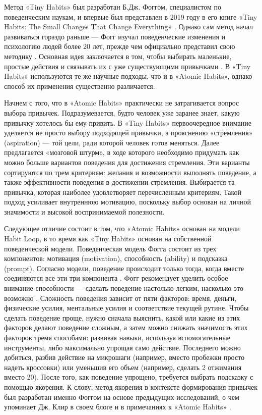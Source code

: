 \documentclass[pdflatex,sn-mathphys-num]{sn-jnl}%
\theoremstyle{thmstyleone}%
\theoremstyle{thmstyletwo}%
\theoremstyle{thmstylethree}%
\begin{document}
Метод «Tiny Habits» был разработан Б.Дж. Фоггом, специалистом по поведенческим наукам, и впервые был представлен в 2019 году в его книге «Tiny Habits: The Small Changes That Change Everything» \cite{phd_tiny_2020}. Однако сам метод начал развиваться гораздо раньше — Фогг изучал поведенческие изменения и психологию людей более 20 лет, прежде чем официально представил свою методику \cite{noauthor_tiny_nodate}. Основная идея заключается в том, чтобы выбирать маленькие, простые действия и связывать их с уже существующими привычками \cite{noauthor_bj_nodate}. В «Tiny Habits» используются те же научные подходы, что и в «Atomic Habits», однако способ их применения существенно различается.

Начнем с того, что в «Atomic Habits» практически не затрагивается вопрос выбора привычек. Подразумевается, будто человек уже заранее знает, какую привычку хотелось бы ему привить. В «Tiny Habits» первоочередное внимание уделяется не просто выбору подходящей привычки, а прояснению «стремления» (aspiration) — той цели, ради которой человек готов меняться. Далее предлагается «мозговой штурм», в ходе которого необходимо придумать как можно больше вариантов поведения для достижения стремления. Эти варианты сортируются по трем критериям: желания и возможности выполнять поведение, а также эффективности поведения в достижении стремления. Выбирается та привычка, которая наиболее удовлетворяет перечисленным критериям. Такой подход усиливает внутреннюю мотивацию, поскольку выбор основан на личной значимости и высокой воспринимаемой полезности.

Следующее отличие состоит в том, что «Atomic Habits» основан на модели Habit Loop, в то время как «Tiny Habits» основан на собственной поведенческой модели. Поведенческая модель Фогга состоит из трех компонентов: мотивация (motivation), способность (ability) и подсказка (prompt). Согласно модели, поведение происходит только тогда, когда вместе соединяются все эти три компонента \cite{fogg_2009}. Фогг рекомендует уделить особое внимание способности — сделать поведение настолько легким, насколько это возможно \cite{phd_tiny_2020}. Сложность поведения зависит от пяти факторов: время, деньги, физические усилия, ментальные усилия и соответствие текущей рутине. Чтобы сделать поведение проще, нужно сначала выяснить, какой или какие из этих факторов делают поведение сложным, а затем можно снижать значимость этих факторов тремя способами: развивая навыки, используя вспомогательные инструменты, либо максимально упрощая само действие. Последнего можно добиться, разбив действие на микрошаги (например, вместо пробежки просто надеть кроссовки) или уменьшив его объем (например, сделать 2 отжимания вместо 20). После того, как поведение упрощено, требуется выбрать подсказку с помощью якорения. К слову, метод якорения в контексте формирования привычек был разработан именно Фоггом на основе предыдущих исследований, о чем упоминает Дж. Клир в своем блоге и в примечаниях к «Atomic Habits» \cite{clear_how_2014, clear_atomic_2018}.
\end{document}
